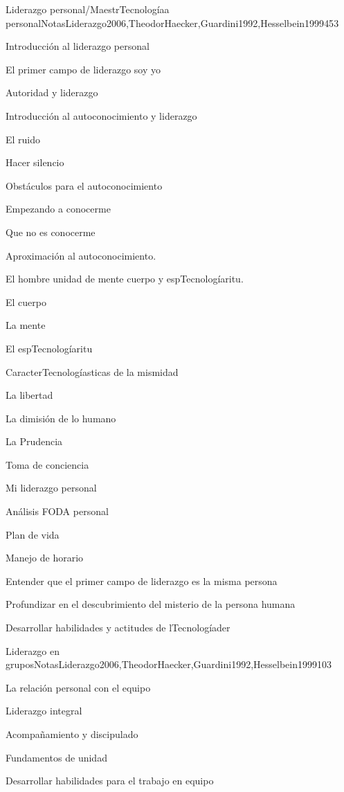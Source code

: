 \begin{syllabus}
\begin{unit}{Liderazgo personal/MaestrTecnologíaa personal}{NotasLiderazgo2006,TheodorHaecker,Guardini1992,Hesselbein1999}{45}{3}
\begin{topics}
	\item Introducción al liderazgo personal
	\item El primer campo de liderazgo soy yo
	\item Autoridad y liderazgo
	\item Introducción al autoconocimiento y liderazgo
	\item El ruido
	\item Hacer silencio
	\item Obstáculos para el autoconocimiento
	\item Empezando a conocerme
	\item Que no es conocerme
	\item Aproximación al autoconocimiento.
	\item El hombre unidad de mente cuerpo y espTecnologíaritu.
	\item El cuerpo
	\item La mente
	\item El espTecnologíaritu
	\item CaracterTecnologíasticas de la mismidad
	\item La libertad
	\item La dimisión de lo humano
	\item La Prudencia
	\item Toma de conciencia
	\item Mi liderazgo personal
	\item Análisis FODA personal
	\item Plan de vida
	\item Manejo de horario
\end{topics}
\begin{learningoutcomes}
	\item Entender que el primer campo de liderazgo es la misma persona
	\item Profundizar en el descubrimiento del misterio de la persona humana
	\item Desarrollar habilidades y actitudes de lTecnologíader
\end{learningoutcomes}
\end{unit}

\begin{unit}{Liderazgo en grupos}{NotasLiderazgo2006,TheodorHaecker,Guardini1992,Hesselbein1999}{10}{3}
\begin{topics}
	\item La relación personal con el equipo
	\item Liderazgo integral
	\item Acompañamiento y discipulado
	\item Fundamentos de unidad
\end{topics}
\begin{learningoutcomes}
	\item Desarrollar habilidades para el trabajo en equipo
\end{learningoutcomes}
\end{unit}




\end{syllabus}
